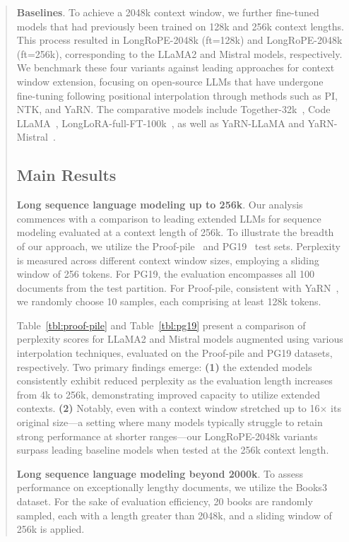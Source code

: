 \begin{abstract}
\textbf{Baselines}. To achieve a 2048k context window, we further fine-tuned models that had previously been trained on 128k and 256k context lengths. This process resulted in LongRoPE-2048k (ft=128k) and LongRoPE-2048k (ft=256k), corresponding to the LLaMA2 and Mistral models, respectively. We benchmark these four variants against leading approaches for context window extension, focusing on open-source LLMs that have undergone fine-tuning following positional interpolation through methods such as PI, NTK, and YaRN. The comparative models include Together-32k~\cite{together}, Code LLaMA~\cite{codellama}, LongLoRA-full-FT-100k~\cite{longlora}, as well as YaRN-LLaMA and YaRN-Mistral~\cite{yarn}.

\subsection{Main Results}

\label{sec:mainresult}
\textbf{Long sequence language modeling up to 256k}. Our analysis commences with a comparison to leading extended LLMs for sequence modeling evaluated at a context length of 256k. To illustrate the breadth of our approach, we utilize the Proof-pile~\cite{pg19} and PG19~\cite{pile} test sets. Perplexity is measured across different context window sizes, employing a sliding window of 256 tokens. For PG19, the evaluation encompasses all 100 documents from the test partition. For Proof-pile, consistent with YaRN~\cite{yarn}, we randomly choose 10 samples, each comprising at least 128k tokens.

Table~\ref{tbl:proof-pile} and Table~\ref{tbl:pg19} present a comparison of perplexity scores for LLaMA2 and Mistral models augmented using various interpolation techniques, evaluated on the Proof-pile and PG19 datasets, respectively. Two primary findings emerge: \textbf{(1)} the extended models consistently exhibit reduced perplexity as the evaluation length increases from 4k to 256k, demonstrating improved capacity to utilize extended contexts. \textbf{(2)} Notably, even with a context window stretched up to 16$\times$ its original size—a setting where many models typically struggle to retain strong performance at shorter ranges—our LongRoPE-2048k variants surpass leading baseline models when tested at the 256k context length.

\textbf{Long sequence language modeling beyond 2000k}. To assess performance on exceptionally lengthy documents, we utilize the Books3~\cite{pile} dataset. For the sake of evaluation efficiency, 20 books are randomly sampled, each with a length greater than 2048k, and a sliding window of 256k is applied.


\end{abstract}
